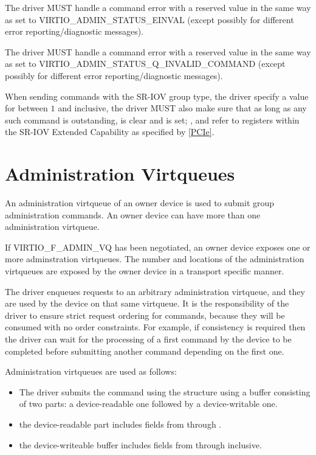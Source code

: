 The driver MUST handle a command error with a reserved 
value in the same way as  set to VIRTIO_ADMIN_STATUS_EINVAL
(except possibly for different error reporting/diagnostic messages).

The driver MUST handle a command error with a reserved
 value in the same way as
 set to
VIRTIO_ADMIN_STATUS_Q_INVALID_COMMAND (except possibly for
different error reporting/diagnostic messages).

When sending commands with the SR-IOV group type,
the driver specify a value for 
between $1$ and  inclusive,
the driver MUST also make sure that as long as any such command
is outstanding,  is clear and
 is set;
,   and
 refer to registers within the SR-IOV Extended
Capability as specified by \hyperref[intro:PCIe]{[PCIe]}.

\section{Administration Virtqueues}\label{sec:Basic Facilities of a Virtio Device / Administration Virtqueues}

An administration virtqueue of an owner device is used to submit
group administration commands. An owner device can have more
than one administration virtqueue.

If VIRTIO_F_ADMIN_VQ has been negotiated, an owner device exposes one
or more adminstration virtqueues. The number and locations of the
administration virtqueues are exposed by the owner device in a transport
specific manner.

The driver enqueues requests to an arbitrary administration
virtqueue, and they are used by the device on that same
virtqueue. It is the responsibility of the driver to ensure
strict request ordering for commands, because they will be
consumed with no order constraints.  For example, if consistency
is required then the driver can wait for the processing of a
first command by the device to be completed before submitting
another command depending on the first one.

Administration virtqueues are used as follows:
\begin{itemize}
\item The driver submits the command using the 
structure using a buffer consisting of two parts: a device-readable one followed by a
device-writable one.
\item the device-readable part includes fields from 
through .
\item the device-writeable buffer includes fields from 
through  inclusive.
\end{itemize}


